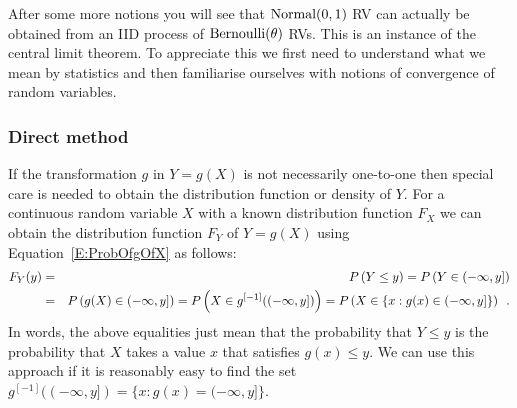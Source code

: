 After some more notions you will see that $\mbox{{\rm Normal}}(0,1)$ RV can actually be obtained from an IID process of $\mbox{{\rm Bernoulli}}(\theta)$ RVs. This is an instance of the central limit theorem. To appreciate this we first need to understand what we mean by statistics and then familiarise ourselves with notions of convergence of random variables.


\subsubsection{Direct method}\label{S:DirectMethod}
If the transformation $g$ in $Y=g(X)$ is not necessarily one-to-one then special care is needed to obtain the distribution function or density of $Y$.  
For a continuous random variable $X$ with a known distribution function $F_X$ we can obtain the distribution function $F_Y$ of $Y=g(X)$ using Equation~\eqref{E:ProbOfgOfX} as follows:
\begin{eqnarray}\label{Eqn:DirectMethod}
F_Y(y)
&=& P \left(Y \leq y \right) = P \left(Y \in (-\infty, y] \right) \notag \\
&=& P \left( g(X) \in (-\infty, y] \right) = P \left( X \in g^{[-1]}((-\infty, y]) \right) = P \left(X \in \{x: g(x) \in (-\infty,y]\}  \right) \enspace . 
\end{eqnarray}
In words, the above equalities just mean that the probability that $Y \leq y$ is the probability that $X$ takes a value $x$ that satisfies $g(x) \leq y$.  
We can use this approach if it is reasonably easy to find the set $g^{[-1]}((-\infty,y]) = \{x: g(x) = (-\infty,y]\}$.%


